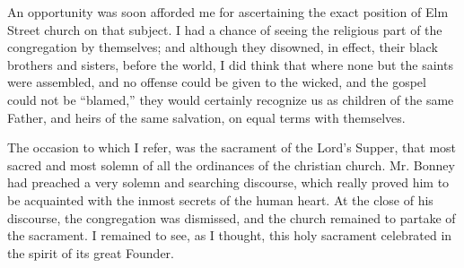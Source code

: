 An opportunity was soon afforded me for ascertaining the exact position
of Elm Street church on that subject. I had a chance of seeing the
religious part of the congregation by themselves; and although they
disowned, in effect, their black brothers and sisters, before the world,
I did think that where none but the saints were assembled, and no
offense could be given to the wicked, and the gospel could not be
``blamed,'' they would certainly recognize us as children of the same
Father, and heirs of the same salvation, on equal terms with themselves.

The occasion to which I refer, was the sacrament of the Lord's Supper,
that most sacred and most solemn of all the ordinances of the christian
church. Mr. Bonney had preached a very solemn and searching discourse,
which really proved him to be acquainted with the inmost secrets of the
human heart. At the close of his discourse, the congregation was
dismissed, and the church remained to partake of the sacrament. I
remained to see, as I thought, this holy sacrament celebrated in the
spirit of its great Founder.

